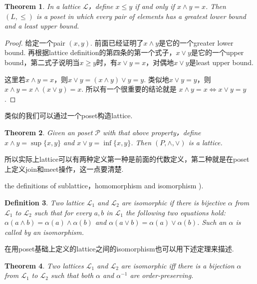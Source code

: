 \documentclass{article}
\newtheorem{theorem}{Theorem}[section]
\newtheorem{definition}[theorem]{Definition}
\newcommand\lattice{\mathcal{L}}
\begin{document}
\begin{theorem}
\rm In a lattice $\lattice$，define $x \leq y$ if and only if $x \wedge y = x$. Then $(L,\leq)$ is a poset in which every pair of elements has a greatest lower bound and a least upper bound.  
\end{theorem}

\begin{proof}
给定一个pair $(x,y)$. 前面已经证明了$x \wedge y$是它的一个greater lower bound. 再根据lattice definition的第四条的第一个式子，$x \vee y$是它的一个upper bound，第二式子说明当$x \geq y$时，有$x \vee y = x$，对偶地$x \vee y$是least upper bound. 

这里若$x \wedge y = x$，则$x \vee y = (x \wedge y) \vee y = y$.  类似地$x \vee y = y$，则$x \wedge y = x \wedge (x \vee y) = x$.  所以有一个很重要的结论就是{\color{blue} $x \wedge y = x \iff x \vee y = y$}.
\end{proof}

{\color{red} 类似的我们可以通过一个poset构造lattice}.

\begin{theorem}
\rm Given an poset $\mathcal{P}$ with that above property，define $x \wedge y = \sup\{x,y\}$ and $x \vee y = \inf\{x,y\}$. Then $(P,\wedge,\vee)$ is a lattice.
\end{theorem}


{\color{blue} 所以实际上lattice可以有两种定义第一种是前面的代数定义，第二种就是在poset上定义join和meet操作，这一点要清楚}.


{\color{red} the definitions of sublattice，homomorphism and isomorphism )}.

\begin{definition}
\rm Two lattice $\lattice_1$ and $\lattice_2$ are {\color{red} isomorphic} if there is {\color{red} bijective} $\alpha$ from $\lattice_1$ to $\lattice_2$ such that for every $a,b$ in $\lattice_1$ the following two equations hold: $\alpha(a \wedge b) = \alpha(a) \wedge \alpha(b)$ and $\alpha(a \vee b) = \alpha(a) \vee \alpha(b)$. Such an $\alpha$ is called by an {\color{red} isomorphism}.  
\end{definition}

{\color{red} 在用poset基础上定义的lattice之间的isomorphism也可以用下述定理来描述}.

\begin{theorem}
\rm Two lattices $\lattice_1$ and $\lattice_2$ are isomorphic iff there is a bijection $\alpha$ from $\lattice_1$ to
$\lattice_2$ such that both $\alpha$ and $\alpha^{-1}$ are {\color{red} order-preserving}. 
\end{theorem}
\end{document}
